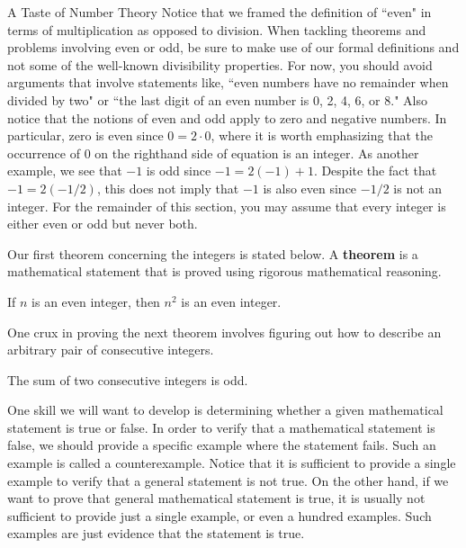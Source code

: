 \begin{section}{A Taste of Number Theory}
Notice that we framed the definition of ``even" in terms of multiplication as opposed to division. When tackling theorems and problems involving even or odd, be sure to make use of our formal definitions and not some of the well-known divisibility properties.  For now, you should avoid arguments that involve statements like, ``even numbers have no remainder when divided by two" or ``the last digit of an even number is 0, 2, 4, 6, or 8." Also notice that the notions of even and odd apply to zero and negative numbers.  In particular, zero is even since $0=2\cdot 0$, where it is worth emphasizing that the occurrence of $0$ on the righthand side of equation is an integer.  As another example, we see that $-1$ is odd since $-1=2(-1)+1$.  Despite the fact that $-1=2(-1/2)$, this does not imply that $-1$ is also even since $-1/2$ is not an integer. For the remainder of this section, you may assume that every integer is either even or odd but never both. %

Our first theorem concerning the integers is stated below.  A \textbf{theorem} is a mathematical statement that is proved using rigorous mathematical reasoning. 

\begin{theorem}\label{thm:n even implies n^2 even}
If $n$ is an even integer, then $n^2$ is an even integer.
\end{theorem}

One crux in proving the next theorem involves figuring out how to describe an arbitrary pair of consecutive integers.

\begin{theorem}\label{thm:two consecutive ints}
The sum of two consecutive integers is odd.
\end{theorem}

One skill we will want to develop is determining whether a given mathematical statement is true or false.  In order to verify that a mathematical statement is false, we should provide a specific example where the statement fails. Such an example is called a counterexample.  Notice that it is sufficient to provide a single example to verify that a general statement is not true.  On the other hand, if we want to prove that general mathematical statement is true, it is usually not sufficient to provide just a single example, or even a hundred examples.  Such examples are just evidence that the statement is true.


\end{section}
